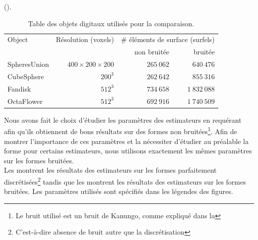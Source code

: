 ().
%
\begin{table}[h]
  \begin{center}
    \caption{Table des objets digitaux utilisés pour la comparaison.}
    \label{tab:feature-objects}
    \begin{tabular}{@{}lrrr@{}}
      \toprule
      Object & Résolution (voxels) & \multicolumn{2}{r}{\# éléments de surface (surfels)} \\ \cmidrule(l){3-4}
                     &            & non bruitée & bruitée \\ \midrule
      SpheresUnion    & $400 \times 200 \times 200$ & $265~062$ & $640~476$ \\
      CubeSphere     & $200^3$    & $262~642$ & $855~316$   \\
      Fandisk        & $512^3$    & $734~658$ & $1~832~088$   \\
      OctaFlower     & $512^3$    & $692~916$ & $1~740~509$   \\ \bottomrule
    \end{tabular}
  \end{center}
\end{table}
%
Nous avons fait le choix d'étudier les paramètres des estimateurs en requérant
afin qu'ils obtiennent de bons résultats sur des formes non bruitées\footnote{Le
bruit utilisé est un bruit de Kanungo, comme expliqué dans la
}. Afin de montrer l'importance de ces paramètres et
la nécessiter d'étudier au préalable la forme pour certains estimateurs, nous
utilisons exactement les mêmes paramètres sur les formes bruitées.
%
\\
%
Les  montrent les
résultats des estimateurs sur les formes parfaitement
discrétisées\footnote{C'est-à-dire absence de bruit autre que la discrétisation}
tandis que les
montrent les résultats des estimateurs sur les formes bruitées. Les paramètres
utilisés sont spécifiés dans les légendes des figures.
%
